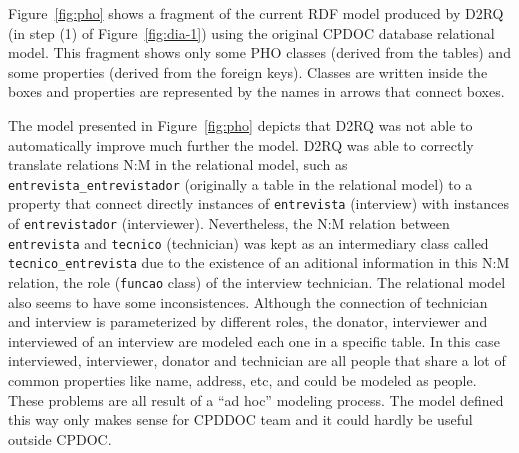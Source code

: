 
Figure~\ref{fig:pho} shows a fragment of the current RDF model
produced by D2RQ (in step (1) of Figure~\ref{fig:dia-1}) using the
original CPDOC database relational model. This fragment shows only
some PHO classes (derived from the tables) and some properties
(derived from the foreign keys). Classes are written inside the boxes
and properties are represented by the names in arrows that connect
boxes.

The model presented in Figure~\ref{fig:pho} depicts that D2RQ was not
able to automatically improve much further the model. D2RQ was able to
correctly translate relations N:M in the relational model, such as
\texttt{entrevista\_entrevistador} (originally a table in the
relational model) to a property that connect directly instances of
\texttt{entrevista} (interview) with instances of
\texttt{entrevistador} (interviewer). Nevertheless, the N:M relation
between \texttt{entrevista} and \texttt{tecnico} (technician) was kept
as an intermediary class called \texttt{tecnico\_entrevista} due to
the existence of an aditional information in this N:M relation, the
role (\texttt{funcao} class) of the interview technician. The
relational model also seems to have some inconsistences. Although the
connection of technician and interview is parameterized by different
roles, the donator, interviewer and interviewed of an interview are
modeled each one in a specific table. In this case interviewed,
interviewer, donator and technician are all people that share a lot of
common properties like name, address, etc, and could be modeled as
people. These problems are all result of a ``ad hoc'' modeling
process. The model defined this way only makes sense for CPDDOC team
and it could hardly be useful outside CPDOC.

